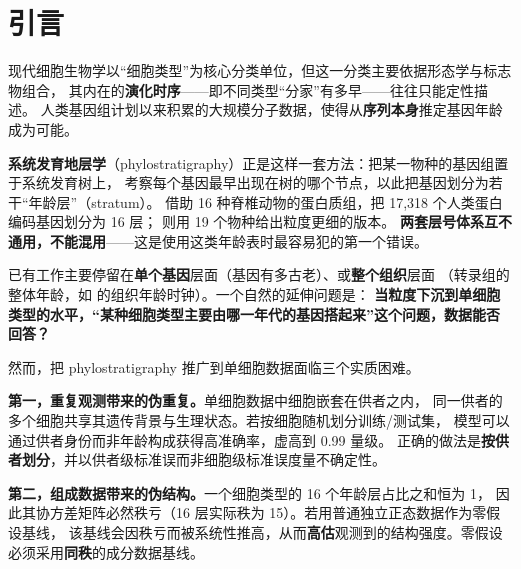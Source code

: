 \documentclass[numsec,webpdf,modern,large]{oup-authoring-template}
\begin{document}

\maketitle
\onecolumn


\section{引言}

现代细胞生物学以“细胞类型”为核心分类单位，但这一分类主要依据形态学与标志物组合，
其内在的\textbf{演化时序}——即不同类型“分家”有多早——往往只能定性描述。
人类基因组计划以来积累的大规模分子数据，使得从\textbf{序列本身}推定基因年龄成为可能。

\textbf{系统发育地层学}（phylostratigraphy）正是这样一套方法：把某一物种的基因组置于系统发育树上，
考察每个基因最早出现在树的哪个节点，以此把基因划分为若干“年龄层”（stratum）。
\citet{trigos2017} 借助 16 种脊椎动物的蛋白质组，把 17,318 个人类蛋白编码基因划分为 16 层；
\citet{domazetloso2017} 则用 19 个物种给出粒度更细的版本。
\textbf{两套层号体系互不通用，不能混用}——这是使用这类年龄表时最容易犯的第一个错误。

已有工作主要停留在\textbf{单个基因}层面（基因有多古老）、或\textbf{整个组织}层面
（转录组的整体年龄，如 \citet{lu2017} 的组织年龄时钟）。一个自然的延伸问题是：
\textbf{当粒度下沉到单细胞类型的水平，“某种细胞类型主要由哪一年代的基因搭起来”这个问题，数据能否回答？}

然而，把 phylostratigraphy 推广到单细胞数据面临三个实质困难。

\textbf{第一，重复观测带来的伪重复。}单细胞数据中细胞嵌套在供者之内，
同一供者的多个细胞共享其遗传背景与生理状态。若按细胞随机划分训练/测试集，
模型可以通过供者身份而非年龄构成获得高准确率，虚高到 0.99 量级。
正确的做法是\textbf{按供者划分}，并以供者级标准误而非细胞级标准误度量不确定性\citep{hafemeister2019}。

\textbf{第二，组成数据带来的伪结构。}一个细胞类型的 16 个年龄层占比之和恒为 1，
因此其协方差矩阵必然秩亏（16 层实际秩为 15）。若用普通独立正态数据作为零假设基线，
该基线会因秩亏而被系统性推高，从而\textbf{高估}观测到的结构强度。零假设必须采用\textbf{同秩}的成分数据基线。
\end{document}
